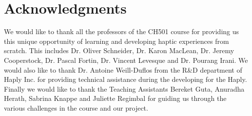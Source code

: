 \section{Acknowledgments}
We would like to thank all the professors of the CH501 course for providing us this unique opportunity of learning and developing haptic experiences from scratch. This includes Dr. Oliver Schneider, Dr. Karon MacLean, Dr. Jeremy Cooperstock, Dr. Pascal Fortin, Dr. Vincent Levesque and Dr. Pourang Irani. We would also like to thank Dr. Antoine Weill-Duflos from the R\&D department of Haply Inc. for providing technical assistance during the developing for the Haply. Finally we would like to thank the Teaching Assistants Bereket Guta, Anuradha Herath, Sabrina Knappe and Juliette Regimbal for guiding us through the various challenges in the course and our project.
